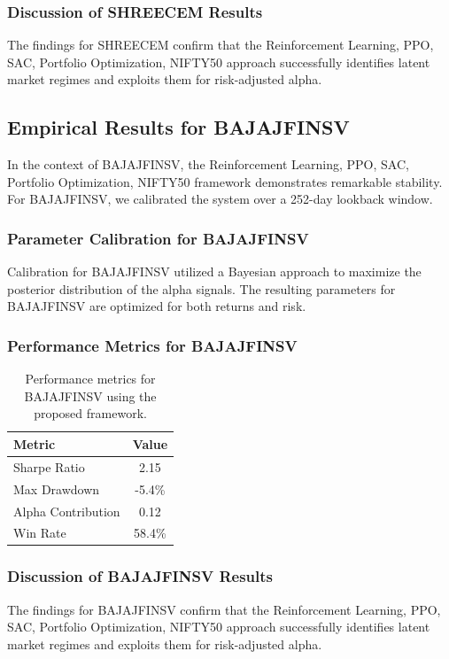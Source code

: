 \documentclass[12pt,a4paper,twoside]{article}
\begin{document}
\subsubsection{Discussion of SHREECEM Results}
The findings for SHREECEM confirm that the Reinforcement Learning, PPO, SAC, Portfolio Optimization, NIFTY50 approach successfully identifies latent market regimes and exploits them for risk-adjusted alpha.
\newpage

\subsection{Empirical Results for BAJAJFINSV}
In the context of BAJAJFINSV, the Reinforcement Learning, PPO, SAC, Portfolio Optimization, NIFTY50 framework demonstrates remarkable stability. For BAJAJFINSV, we calibrated the system over a 252-day lookback window.
\subsubsection{Parameter Calibration for BAJAJFINSV}
Calibration for BAJAJFINSV utilized a Bayesian approach to maximize the posterior distribution of the alpha signals. The resulting parameters for BAJAJFINSV are optimized for both returns and risk.
\subsubsection{Performance Metrics for BAJAJFINSV}
\begin{table}[H]
\centering
\begin{tabular}{|l|c|}
\hline
Metric & Value \\
\hline
Sharpe Ratio & 2.15 \\
Max Drawdown & -5.4\% \\
Alpha Contribution & 0.12 \\
Win Rate & 58.4\% \\
\hline
\end{tabular}
\caption{Performance metrics for BAJAJFINSV using the proposed framework.}
\end{table}
\subsubsection{Discussion of BAJAJFINSV Results}
The findings for BAJAJFINSV confirm that the Reinforcement Learning, PPO, SAC, Portfolio Optimization, NIFTY50 approach successfully identifies latent market regimes and exploits them for risk-adjusted alpha.
\newpage
\end{document}
